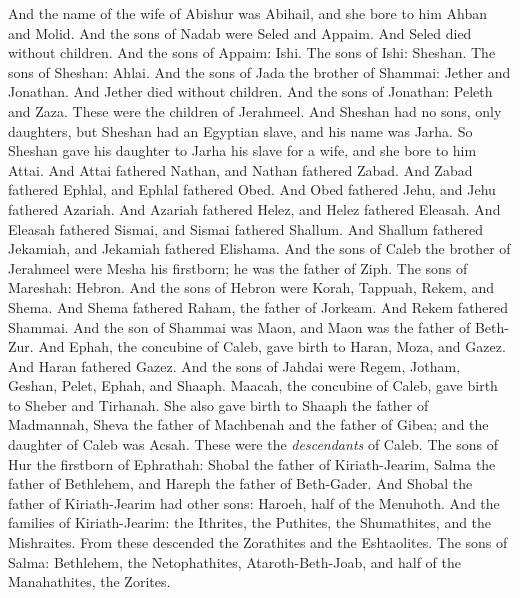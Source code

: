 \begin{biblechapter}
\verse And the name of the wife of Abishur was Abihail, and she bore to him Ahban and Molid.
\verse And the sons of Nadab were Seled and Appaim. And Seled died without children.
\verse And the sons of Appaim: Ishi. The sons of Ishi: Sheshan. The sons of Sheshan: Ahlai.
\verse And the sons of Jada the brother of Shammai: Jether and Jonathan. And Jether died without children.
\verse And the sons of Jonathan: Peleth and Zaza. These were the children of Jerahmeel.
\verse And Sheshan had no sons, only daughters, but Sheshan had an Egyptian slave, and his name was Jarha.
\verse So Sheshan gave his daughter to Jarha his slave for a wife, and she bore to him Attai.
\verse And Attai fathered Nathan, and Nathan fathered Zabad.
\verse And Zabad fathered Ephlal, and Ephlal fathered Obed.
\verse And Obed fathered Jehu, and Jehu fathered Azariah.
\verse And Azariah fathered Helez, and Helez fathered Eleasah.
\verse And Eleasah fathered Sismai, and Sismai fathered Shallum.
\verse And Shallum fathered Jekamiah, and Jekamiah fathered Elishama.
\verse And the sons of Caleb the brother of Jerahmeel were Mesha his firstborn; he was the father of Ziph. The sons of Mareshah: Hebron.
\verse And the sons of Hebron were Korah, Tappuah, Rekem, and Shema.
\verse And Shema fathered Raham, the father of Jorkeam. And Rekem fathered Shammai.
\verse And the son of Shammai was Maon, and Maon was the father of Beth-Zur.
\verse And Ephah, the concubine of Caleb, gave birth to Haran, Moza, and Gazez. And Haran fathered Gazez.
\verse And the sons of Jahdai were Regem, Jotham, Geshan, Pelet, Ephah, and Shaaph.
\verse Maacah, the concubine of Caleb, gave birth to Sheber and Tirhanah.
\verse She also gave birth to Shaaph the father of Madmannah, Sheva the father of Machbenah and the father of Gibea; and the daughter of Caleb was Acsah.
\verse These were the \textit{descendants} of Caleb.
\verse The sons of Hur the firstborn of Ephrathah: Shobal the father of Kiriath-Jearim,
\verse Salma the father of Bethlehem, and Hareph the father of Beth-Gader.
\verse And Shobal the father of Kiriath-Jearim had other sons: Haroeh, half of the Menuhoth.
\verse And the families of Kiriath-Jearim: the Ithrites, the Puthites, the Shumathites, and the Mishraites. From these descended the Zorathites and the Eshtaolites.
\verse The sons of Salma: Bethlehem, the Netophathites, Ataroth-Beth-Joab, and half of the Manahathites, the Zorites.
\end{biblechapter}

